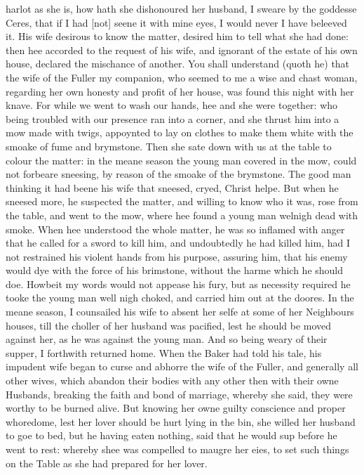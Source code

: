 harlot as she is, how hath she dishonoured her husband, I sweare by the
goddesse Ceres, that if I had [not] seene it with mine eyes, I would never I
have beleeved it. His wife desirous to know the matter, desired him to tell
what she had done: then hee accorded to the request of his wife, and ignorant
of the estate of his own house, declared the mischance of another. You shall
understand (quoth he) that the wife of the Fuller my companion, who seemed to
me a wise and chast woman, regarding her own honesty and profit of her house,
was found this night with her knave. For while we went to wash our hands, hee
and she were together: who being troubled with our presence ran into a corner,
and she thrust him into a mow made with twigs, appoynted to lay on clothes to
make them white with the smoake of fume and brymstone. Then she sate down with
us at the table to colour the matter: in the meane season the young man covered
in the mow, could not forbeare sneesing, by reason of the smoake of the
brymstone. The good man thinking it had beene his wife that sneesed, cryed,
Christ helpe. But when he sneesed more, he suspected the matter, and willing to
know who it was, rose from the table, and went to the mow, where hee found a
young man welnigh dead with smoke. When hee understood the whole matter, he was
so inflamed with anger that he called for a sword to kill him, and undoubtedly
he had killed him, had I not restrained his violent hands from his purpose,
assuring him, that his enemy would dye with the force of his brimstone, without
the harme which he should doe. Howbeit my words would not appease his fury, but
as necessity required he tooke the young man well nigh choked, and carried him
out at the doores. In the meane season, I counsailed his wife to absent her
selfe at some of her Neighbours houses, till the choller of her husband was
pacified, lest he should be moved against her, as he was against the young man.
And so being weary of their supper, I forthwith returned home. When the Baker
had told his tale, his impudent wife began to curse and abhorre the wife of the
Fuller, and generally all other wives, which abandon their bodies with any
other then with their owne Husbands, breaking the faith and bond of marriage,
whereby she said, they were worthy to be burned alive. But knowing her owne
guilty conscience and proper whoredome, lest her lover should be hurt lying in
the bin, she willed her husband to goe to bed, but he having eaten nothing,
said that he would sup before he went to rest: whereby shee was compelled to
maugre her eies, to set such things on the Table as she had prepared for her
lover.

